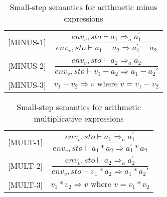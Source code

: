 \begin{table}[H]
    \centering
    \begin{longtable}[c] { r c }
        [MINUS-1] & \( \dfrac{ env_v,sto \vdash a_1 \Rightarrow_a a^{'}_{1}}{env_v,sto \vdash a_1 - a_2 \Rightarrow a^{'}_{1} - a_2} \) \\
        
        [MINUS-2] & \( \dfrac{ env_v,sto \vdash a_2 \Rightarrow_a a^{'}_{2}}{env_v,sto \vdash v_1 - a_2 \Rightarrow a_{1} - a_2{'}} \) \\
        
        [MINUS-3] & \(v_1 - v_2 \Rightarrow v \text{ where } v = v_1 - v_2\) \\
    \end{longtable}
    \caption{Small-step semantics for arithmetic minus expressions}\label{tab:sss_aud}
\end{table}

\begin{table}[H]
    \centering
    \begin{longtable}[c] { r c }
        [MULT-1] & \( \dfrac{ env_v,sto \vdash a_1 \Rightarrow_a a^{'}_{1}}{env_v,sto \vdash a_1 * a_2 \Rightarrow a^{'}_{1} * a_2} \) \\
        
        [MULT-2] & \( \dfrac{ env_v,sto \vdash a_2 \Rightarrow_a a^{'}_{2}}{env_v,sto \vdash v_1 * a_2 \Rightarrow a_{1} * a_2{'}} \) \\
        
        [MULT-3] & \(v_1 * v_2 \Rightarrow v \text{ where } v = v_1 * v_2\) \\
    \end{longtable}
    \caption{Small-step semantics for arithmetic multiplicative expressions}\label{tab:sss_aud}
\end{table}



